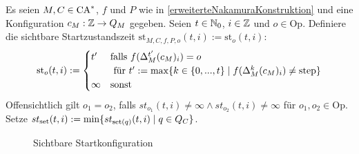 \begin{definition}
    Es seien $M, C \in \textrm{CA}^*$, $f$ und $P$ wie in \cref{erweiterteNakamuraKonstruktion} und eine Konfiguration $c_M: \mathbb{Z} \to Q_M$ gegeben.
    Seien $t \in \mathbb{N}_0$, $i \in \mathbb{Z}$ und $o \in \mathrm{Op}$.
    Definiere die sichtbare Startzustandszeit $\mathrm{st}_{M, C, f, P, o}(t, i) := \mathrm{st}_o(t, i)$:
    \[
        \mathrm{st}_o(t, i) :=
        \begin{cases}
            t' &
                \text{falls } f(\Delta_M^{t'}(c_M)_i) = o \\
                & \text{ für } t' := \max \{ { k \in \{ {0, ..., t} \} } \; | \; { f(\Delta_M^{k}(c_M)_i) \neq \mathrm{step} } \}
            \\
            \infty & \text{sonst}
        \end{cases}
    \]
    Offensichtlich gilt $o_1 = o_2$, falls $st_{o_1}(t, i) \neq \infty \land st_{o_2}(t, i) \neq \infty$ für $o_1, o_2 \in \mathrm{Op}$.
    Setze $st_{\mathrm{set}}(t, i) := \min \{ { st_{\mathrm{set}(q)}(t, i)} \; | \; { q \in Q_C } \}$.
    
    \newcommand{\setq}{\scriptsize $\mathrm{set}$}
    \newcommand{\setp}{\scriptsize $\mathrm{set}'$}
    
    \begin{figure}[h!]
        \begin{center}
        
        \end{center}
        \caption{Sichtbare Startkonfiguration}
        \label{fig:SichtbareStartkonfiguration}
        

\end{figure}
\end{definition}

